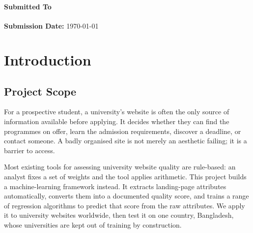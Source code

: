 \documentclass[11pt,a4paper]{article}
\begin{document}
\begin{titlepage}
{\large\bfseries Submitted To}\\[5pt]
\\[0.8cm]

\vfill
{\large\bfseries Submission Date:} \today
\end{titlepage}

\tableofcontents
\newpage

\section{Introduction}

\subsection{Project Scope}

For a prospective student, a university's website is often the only source of information
available before applying. It decides whether they can find the programmes on offer, learn the
admission requirements, discover a deadline, or contact someone. A badly organised site is not
merely an aesthetic failing; it is a barrier to access.

Most existing tools for assessing university website quality are rule-based: an analyst fixes a
set of weights and the tool applies arithmetic. This project builds a machine-learning framework
instead. It extracts landing-page attributes automatically, converts them into a documented
quality score, and trains a range of regression algorithms to predict that score from the raw
attributes. We apply it to \nUni{} university websites worldwide, then test it on one country,
Bangladesh, whose universities are kept out of training by construction.
\end{document}

